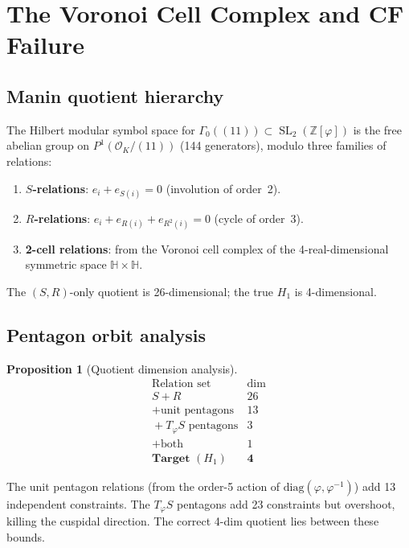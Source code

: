 \documentclass[11pt,a4paper]{article}
\theoremstyle{plain}
\newtheorem{proposition}[theorem]{Proposition}
\theoremstyle{definition}
\theoremstyle{remark}
\numberwithin{equation}{section}
\providecommand{\ZZ}{\mathbb{Z}}
\providecommand{\cO}{\mathcal{O}}
\providecommand{\SL}{\operatorname{SL}}
\begin{document}
\section{The Voronoi Cell Complex and CF Failure}\label{sec:voronoi}

\subsection{Manin quotient hierarchy}

The Hilbert modular symbol space for $\Gamma_0((11)) \subset \SL_2(\ZZ[\varphi])$
is the free abelian group on $P^1(\cO_K/(11))$ (144 generators), modulo
three families of relations:

\begin{enumerate}
\item \textbf{$S$-relations}: $e_i + e_{S(i)} = 0$ (involution of order~2).
\item \textbf{$R$-relations}: $e_i + e_{R(i)} + e_{R^2(i)} = 0$ (cycle of order~3).
\item \textbf{2-cell relations}: from the Voronoi cell complex of the
  4-real-dimensional symmetric space $\mathbb{H} \times \mathbb{H}$.
\end{enumerate}

The $(S,R)$-only quotient is 26-dimensional; the true $H_1$ is 4-dimensional.

\subsection{Pentagon orbit analysis}

\begin{proposition}[Quotient dimension analysis]\label{prop:voronoi}
\[
\begin{array}{l|c}
\text{Relation set} & \dim \\
\hline
S + R & 26 \\
{} + \text{unit pentagons} & 13 \\
{} + T_\varphi S \text{ pentagons} & 3 \\
{} + \text{both} & 1 \\
\textbf{Target } (H_1) & \mathbf{4}
\end{array}
\]
\end{proposition}

The unit pentagon relations (from the order-5 action of
$\mathrm{diag}(\varphi, \varphi^{-1})$) add 13 independent constraints.
The $T_\varphi S$ pentagons add 23 constraints but overshoot, killing the
cuspidal direction.  The correct 4-dim quotient lies between these bounds.
\end{document}
